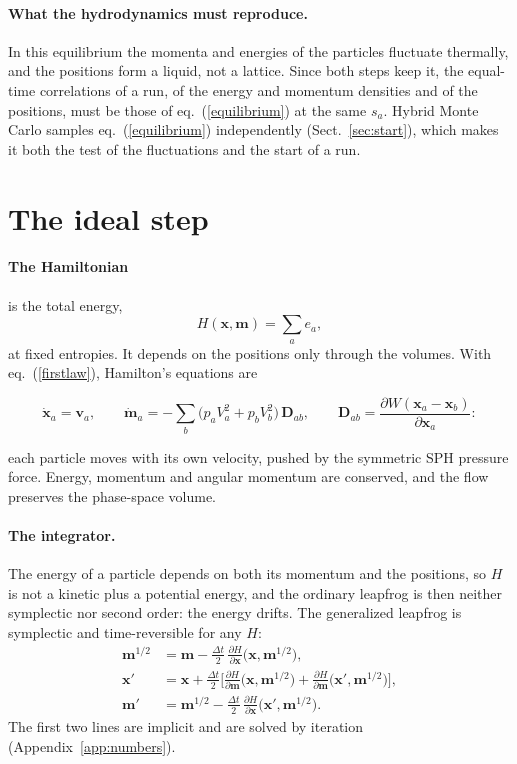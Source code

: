 \documentclass[11pt,aps,preprint,nofootinbib,superscriptaddress,tightenlines]{revtex4-2}
\def\st{\begin{equation}}
\def\stp{\end{equation}}
\def\Eq#1{eq.~(\ref{#1})}
\def\Sect#1{Sect.~\ref{#1}}
\def\App#1{Appendix~\ref{#1}}
\let\oldparagraph\paragraph
\renewcommand{\paragraph}{\par\bigskip\oldparagraph}
\begin{document}
\paragraph{What the hydrodynamics must reproduce.}  In this equilibrium the momenta and energies of the particles fluctuate thermally, and the
positions form a liquid, not a lattice.  Since both steps keep it, the equal-time correlations of a run, of the energy and momentum densities
and of the positions, must be those of \Eq{equilibrium} at the same $s_a$.  Hybrid Monte Carlo samples \Eq{equilibrium} independently
(\Sect{sec:start}), which makes it both the test of the fluctuations and the start of a run.

\section{The ideal step}
\label{sec:ideal}

\paragraph{The Hamiltonian} is the total energy,
\st
H(\bm x,\bm m)=\sum_ae_a ,
\stp
at fixed entropies.  It depends on the positions only through the volumes.  With \Eq{firstlaw}, Hamilton's equations are
\begin{keyeq}
\st
\dot{\bm x}_a=\bm v_a,\qquad
\dot{\bm m}_a=-\sum_b\big(p_aV_a^2+p_bV_b^2\big)\,\bm D_{ab},\qquad
\bm D_{ab}=\frac{\partial W(\bm x_a-\bm x_b)}{\partial\bm x_a} :
\stp
\end{keyeq}
each particle moves with its own velocity, pushed by the symmetric SPH pressure force.  Energy, momentum and angular momentum are
conserved, and the flow preserves the phase-space volume.

\paragraph{The integrator.}  The energy of a particle depends on both its momentum and the positions, so $H$ is not a kinetic plus a potential
energy, and the ordinary leapfrog is then neither symplectic nor second order: the energy drifts.  The generalized leapfrog is symplectic
and time-reversible for any $H$:
\st
\begin{aligned}
\bm m^{1/2}&=\bm m-\frac{\Delta t}2\,\frac{\partial H}{\partial\bm x}\big(\bm x,\bm m^{1/2}\big),\\
\bm x'&=\bm x+\frac{\Delta t}2\Big[\frac{\partial H}{\partial\bm m}\big(\bm x,\bm m^{1/2}\big)+\frac{\partial H}{\partial\bm m}\big(\bm x',\bm m^{1/2}\big)\Big],\\
\bm m'&=\bm m^{1/2}-\frac{\Delta t}2\,\frac{\partial H}{\partial\bm x}\big(\bm x',\bm m^{1/2}\big).
\end{aligned}
\label{glf}
\stp
The first two lines are implicit and are solved by iteration (\App{app:numbers}).
\end{document}
